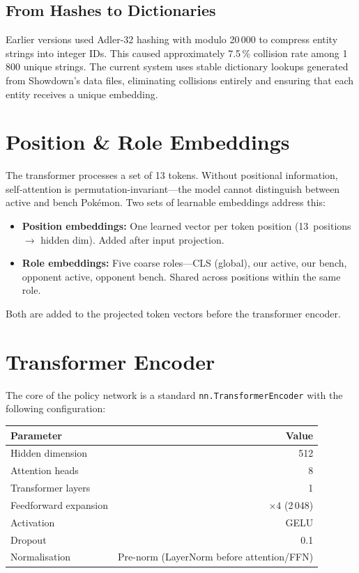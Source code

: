 \subsection{From Hashes to Dictionaries}

Earlier versions used Adler-32 hashing with modulo 20\,000 to compress entity
strings into integer IDs.  This caused approximately 7.5\,\% collision rate
among 1\,800 unique strings.  The current system uses stable dictionary
lookups generated from Showdown's data files, eliminating collisions entirely
and ensuring that each entity receives a unique embedding.

\section{Position \& Role Embeddings}

The transformer processes a set of 13 tokens.  Without positional information,
self-attention is permutation-invariant---the model cannot distinguish between
active and bench Pok\'{e}mon.  Two sets of learnable embeddings address this:

\begin{itemize}
  \item \textbf{Position embeddings:} One learned vector per token position
        (13~positions $\to$ hidden dim).  Added after input projection.
  \item \textbf{Role embeddings:} Five coarse roles---CLS (global), our
        active, our bench, opponent active, opponent bench.  Shared across
        positions within the same role.
\end{itemize}

Both are added to the projected token vectors before the transformer encoder.

\section{Transformer Encoder}

The core of the policy network is a standard \texttt{nn.TransformerEncoder}
with the following configuration:

\begin{center}
\small
\begin{tabularx}{0.6\textwidth}{l r}
  \toprule
  \textbf{Parameter} & \textbf{Value} \\
  \midrule
  Hidden dimension     & 512 \\
  Attention heads      & 8 \\
  Transformer layers   & 1 \\
  Feedforward expansion & $\times 4$ (2\,048) \\
  Activation           & GELU \\
  Dropout              & 0.1 \\
  Normalisation        & Pre-norm (LayerNorm before attention/FFN) \\
  \bottomrule
\end{tabularx}
\end{center}

